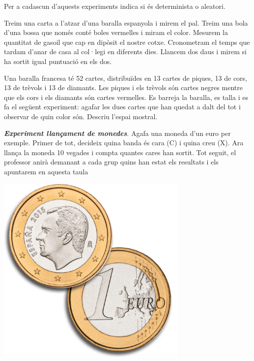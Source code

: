 \begin{mylist}
\exer \mental Per a cadascun d'aquests experiments indica si és determinista o aleatori.
\begin{tasks} 
	\task  Treim una carta a l'atzar d'una baralla espanyola i mirem el pal.
	\task  Treim una bola d'una bossa que només conté boles vermelles i miram el color.
	\task  Mesurem la quantitat de gasoil que cap en dipòsit el nostre cotxe.
	\task  Cronometram el temps que tardam d'anar de casa al col·legi en diferents dies.
	\task  Llancem dos daus i mirem si ha sortit igual puntuació en els dos.
\end{tasks}

\exer  Una baralla francesa té 52 cartes, distribuïdes en 13 cartes de piques, 13 de cors, 13 de trèvols i 13 de diamants. Les piques i els trèvols són cartes negres mentre que els cors i els diamants són cartes vermelles. Es barreja la baralla, es talla i es fa el següent experiment: agafar les dues cartes que han quedat a dalt del tot i observar de quin color són. Descriu l'espai mostral. 
  
\vspace{-2cm}
\exer \simbolsearch \begin{minipage}[t]{0.7\textwidth} \textit{\bf Experiment llançament de monedes}.
	 Agafa una moneda d'un euro per exemple. Primer de tot, decideix quina banda és cara (C) i quina creu (X). Ara llança la moneda 10 vegades i compta quantes cares han sortit.  Tot seguit, el professor anirà demanant a cada grup quins han estat els resultats i els apuntarem en aquesta taula
	\end{minipage}
\begin{minipage}{0.3\textwidth}
	\vspace{2cm}
	\centering
	\includegraphics[width=0.7\textwidth]{img-04/monedes}
\end{minipage}
	


\end{mylist}
